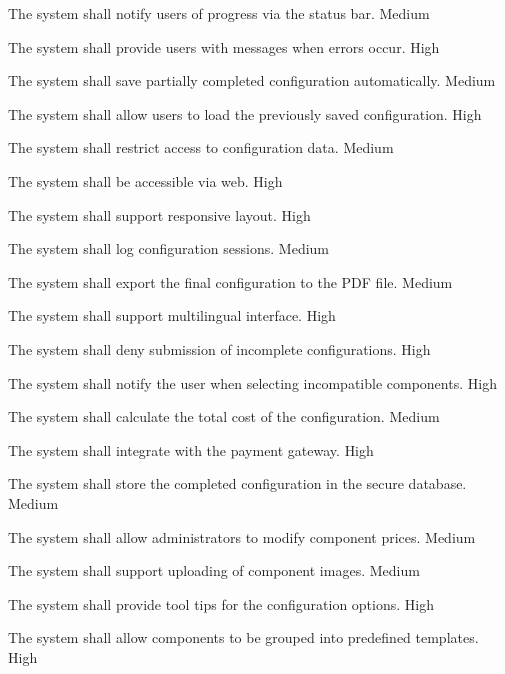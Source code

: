   {
    The system shall notify users of progress via the status bar.
  }
  {Medium}

  {
    The system shall provide users with messages when errors occur.
  }
  {High}

  {
    The system shall save partially completed configuration automatically.
  }
  {Medium}

  {
    The system shall allow users to load the previously saved configuration.
  }
  {High}

  {
    The system shall restrict access to configuration data.
  }
  {Medium}

  {
    The system shall be accessible via web.
  }
  {High}

  {
    The system shall support responsive layout.
  }
  {High}

  {
    The system shall log configuration sessions.
  }
  {Medium}

  {
    The system shall export the final configuration to the PDF file.
  }
  {Medium}

  {
    The system shall support multilingual interface.
  }
  {High}

  {
    The system shall deny submission of incomplete configurations.
  }
  {High}

  {
    The system shall notify the user when selecting incompatible components.
  }
  {High}

  {
    The system shall calculate the total cost of the configuration.
  }
  {Medium}

  {
    The system shall integrate with the payment gateway.
  }
  {High}

  {
    The system shall store the completed configuration in the secure database.
  }
  {Medium}

  {
    The system shall allow administrators to modify component prices.
  }
  {Medium}

  {
    The system shall support uploading of component images.
  }
  {Medium}

  {
    The system shall provide tool tips for the configuration options.
  }
  {High}

  {
    The system shall allow components to be grouped into predefined templates.
  }
  {High}

